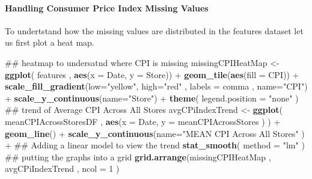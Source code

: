 \documentclass[]{article}
\newenvironment{Shaded}{\begin{snugshade}}{\end{snugshade}}
\newcommand{\KeywordTok}[1]{\textcolor[rgb]{0.13,0.29,0.53}{\textbf{{#1}}}}
\newcommand{\DataTypeTok}[1]{\textcolor[rgb]{0.13,0.29,0.53}{{#1}}}
\newcommand{\DecValTok}[1]{\textcolor[rgb]{0.00,0.00,0.81}{{#1}}}
\newcommand{\StringTok}[1]{\textcolor[rgb]{0.31,0.60,0.02}{{#1}}}
\newcommand{\NormalTok}[1]{{#1}}
\begin{document}
\paragraph{Handling Consumer Price Index Missing
Values}\label{handling-consumer-price-index-missing-values}

To undertstand how the missing values are distributed in the features
dataset let us first plot a heat map.

\begin{Shaded}
\end{Shaded}

\begin{Shaded}
\begin{Highlighting}[]
\NormalTok{## heatmap to undersatnd where CPI is missing}
\NormalTok{missingCPIHeatMap <-}\StringTok{ }\KeywordTok{ggplot}\NormalTok{( features , }\KeywordTok{aes}\NormalTok{(}\DataTypeTok{x =} \NormalTok{Date, }\DataTypeTok{y =} \NormalTok{Store)) +}\StringTok{ }
\StringTok{  }\KeywordTok{geom_tile}\NormalTok{(}\KeywordTok{aes}\NormalTok{(}\DataTypeTok{fill =} \NormalTok{CPI)) +}
\StringTok{  }\KeywordTok{scale_fill_gradient}\NormalTok{(}\DataTypeTok{low=}\StringTok{"yellow"}\NormalTok{, }\DataTypeTok{high=}\StringTok{"red"} \NormalTok{, }\DataTypeTok{labels =} \NormalTok{comma , }\DataTypeTok{name=}\StringTok{"CPI"}\NormalTok{) +}
\StringTok{  }\KeywordTok{scale_y_continuous}\NormalTok{(}\DataTypeTok{name=}\StringTok{"Store"}\NormalTok{) +}
\StringTok{  }\KeywordTok{theme}\NormalTok{( }\DataTypeTok{legend.position =} \StringTok{"none"} \NormalTok{)}
\NormalTok{## trend of Average CPI Across All Stores}
\NormalTok{avgCPiIndexTrend <-}\StringTok{ }\KeywordTok{ggplot}\NormalTok{( meanCPIAcrossStoresDF , }\KeywordTok{aes}\NormalTok{(}\DataTypeTok{x =} \NormalTok{Date, }\DataTypeTok{y =} \NormalTok{meanCPIAcrossStores ) ) +}\StringTok{ }
\StringTok{  }\KeywordTok{geom_line}\NormalTok{() +}
\StringTok{  }\KeywordTok{scale_y_continuous}\NormalTok{(}\DataTypeTok{name=}\StringTok{"MEAN CPI Across All Stores"} \NormalTok{) +}
\StringTok{  }\NormalTok{## Adding a linear model to view the trend}
\StringTok{  }\KeywordTok{stat_smooth}\NormalTok{( }\DataTypeTok{method =} \StringTok{"lm"} \NormalTok{)}
\NormalTok{## putting the graphs into a grid}
\KeywordTok{grid.arrange}\NormalTok{(missingCPIHeatMap , avgCPiIndexTrend , }\DataTypeTok{ncol =} \DecValTok{1} \NormalTok{)}
\end{Highlighting}
\end{Shaded}
\end{document}
